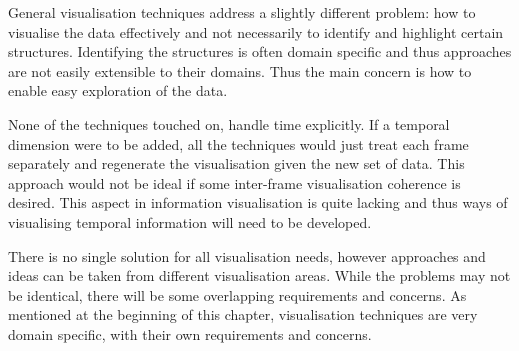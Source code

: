 General visualisation techniques address a slightly different problem: how to
visualise the data effectively and not necessarily to identify and highlight
certain structures. Identifying the structures is often domain specific and
thus approaches are not easily extensible to their domains. Thus the main
concern is how to enable easy exploration of the data.

None of the techniques touched on, handle time explicitly. If a temporal
dimension were to be added, all the techniques would just treat each frame
separately and regenerate the visualisation given the new set of data.  This
approach would not be ideal if some inter-frame visualisation coherence is
desired. This aspect in information visualisation is quite lacking and thus
ways of visualising temporal information will need to be developed.

There is no single solution for all visualisation needs, however approaches and
ideas can be taken from different visualisation areas. While the problems may
not be identical, there will be some overlapping requirements and concerns. As
mentioned at the beginning of this chapter, visualisation techniques are very
domain specific, with their own requirements and concerns.



